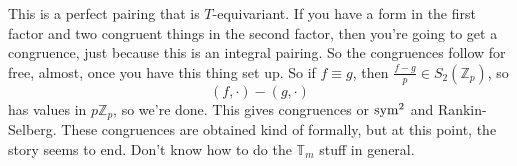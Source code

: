 \documentclass[reqno]{amsart} 
\begin{document}
This is a perfect pairing that is $T$-equivariant.  If you have a form in the first factor and two congruent things in the second factor, then you're going to get a congruence, just because this is an integral pairing.  So the congruences follow for free, almost, once you have this thing set up.  So if $f \equiv g$, then $\frac{f - g}{p} \in S_2(\mathbb{Z}_p)$, so
\begin{equation*}
  (f, \cdot) -(g, \cdot)
\end{equation*}
has values in $p \mathbb{Z}_p$, so we're done.  This gives congruences or $\operatorname{sym}^2$ and Rankin-Selberg.  These congruences are obtained kind of formally, but at this point, the story seems to end.  Don't know how to do the $\mathbb{T}_m$ stuff in general.





{} 
\end{document}
